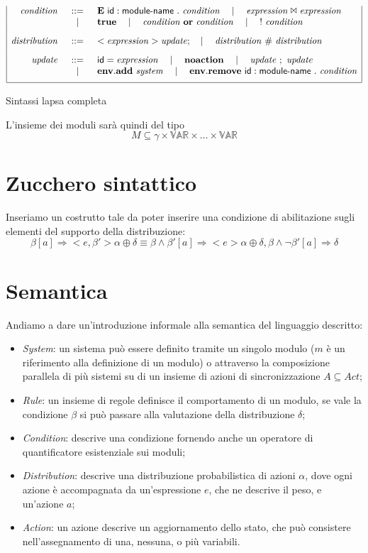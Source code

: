 \begin{table}
$$\begin{array}{|rcl|}
\mathit{condition} &::=& \mathbf{E} \mbox{ } {\sf id}:{\sf module}\textrm{-}{\sf name} \mbox{ } . \mbox{ } \mathit{condition} \quad\mid\quad \mathit{expression} \Join \mathit{expression} \\
	& \quad\mid\quad & \mathbf{true} \quad\mid\quad \mathit{condition} \mbox{ } \mathbf{or} \mbox{ } \mathit{condition} \quad\mid\quad {\sf !} \mbox{ } \mathit{condition}
	\\[.3cm]
\mathit{distribution} &::=& <\mathit{expression}> \mathit{update}; \quad\mid\quad \mathit{distribution} \mbox{ } \# \mbox{ } \mathit{distribution}
	\\[.3cm]
\mathit{update} &::=& {\sf id} = \mathit{expression} \quad\mid\quad \mathbf{noaction} \quad\mid\quad \mathit{update} \mbox{ } ; \mbox{ } \mathit{update} \\
	& \quad\mid\quad & \mathbf{env.add} \mbox{ } \mathit{system} \quad\mid\quad \mathbf{env.remove} \mbox{ } {\sf id}:{\sf module}\textrm{-}{\sf name} \mbox{ } . \mbox{ } \mathit{condition} 
	\\[.2cm]
\hline
\end{array}
$$
\label{tab:lapsasyntax}
\caption{Sintassi \ac{lapsa} completa}
\end{table}

L'insieme dei moduli sarà quindi del tipo
$$ M \subseteq \gamma \times \mathbb{VAR} \times \dots \times \mathbb{VAR} $$

\section{Zucchero sintattico}
Inseriamo un costrutto tale da poter inserire una condizione di abilitazione sugli elementi del supporto della distribuzione:
$$
\beta [a]\Rightarrow <e,\beta'> \alpha \oplus \delta
\equiv 
\beta \wedge \beta' [a]\Rightarrow <e> \alpha \oplus \delta,
\beta \wedge \neg\beta' [a]\Rightarrow \delta
$$

\section{Semantica}
Andiamo a dare un'introduzione informale alla semantica del linguaggio descritto:
\begin{itemize}
	\item \emph{System}: un sistema può essere definito tramite un singolo modulo ($m$ è un riferimento alla definizione di un modulo) o attraverso la composizione parallela di più sistemi su di un insieme di azioni di sincronizzazione $A \subseteq Act$;
	\item \emph{Rule}: un insieme di regole definisce il comportamento di un modulo, se vale la condizione $\beta$ si può passare alla valutazione della distribuzione $\delta$;
	\item \emph{Condition}: descrive una condizione fornendo anche un operatore di quantificatore esistenziale sui moduli;
	\item \emph{Distribution}: descrive una distribuzione probabilistica di azioni $\alpha$, dove ogni azione è accompagnata da un'espressione $e$, che ne descrive il peso, e un'azione $a$;
	\item \emph{Action}: un azione descrive un aggiornamento dello stato, che può consistere nell'assegnamento di una, nessuna, o più variabili.
\end{itemize}

